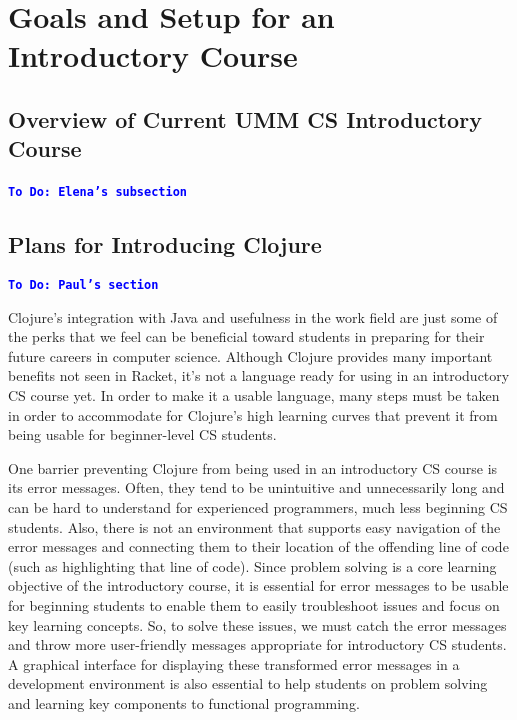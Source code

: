 \documentclass[12pt]{article}
\newcommand{\comment}[1]{{\bf \tt  {#1}}}
\newcommand{\todo}[1]{\textcolor{blue}{\comment{To Do: {#1}}}}
\begin{document}
\section{Goals and Setup for an Introductory Course}\label{sec:racket-clojure}

\subsection{Overview of Current UMM CS Introductory Course}\label{subsec:course}
\todo{Elena's subsection}
~\cite{htdp}

\subsection{Plans for Introducing Clojure}\label{subsec:plans}
\todo{Paul's section}

Clojure’s integration with Java and usefulness in the work field are just some of the perks that we feel can be beneficial toward students in preparing for their future careers in computer science.  Although Clojure provides many important benefits not seen in Racket, it’s not a language ready for using in an introductory CS course yet. In order to make it a usable language, many steps must be taken in order to accommodate for Clojure’s high learning curves that prevent it from being usable for beginner-level CS students.

One barrier preventing Clojure from being used in an introductory CS course is its error messages. Often, they tend to be unintuitive and unnecessarily long and can be hard to understand for experienced programmers, much less beginning CS students. Also, there is not an environment that supports easy navigation of the error messages and connecting them to their location of the offending line of code (such as highlighting that line of code). Since problem solving is a core learning objective of the introductory course, it is essential for error messages to be usable for beginning students to enable them to easily troubleshoot issues and focus on key learning concepts. So, to solve these issues, we must catch the error messages and throw more user-friendly messages appropriate for introductory CS students.  A graphical interface for displaying these transformed error messages in a development environment is also essential to help students on problem solving and learning key components to functional programming.  
\end{document}

